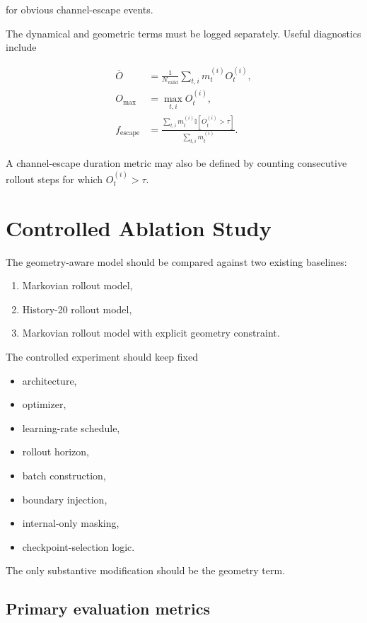\documentclass[11pt]{article}
\begin{document}
for obvious channel-escape events.

The dynamical and geometric terms must be logged separately. Useful diagnostics include

\begin{align}
    \overline{O}
    &=
    \frac{1}{N_{\mathrm{valid}}}
    \sum_{t,i}
    m_t^{(i)} O_t^{(i)},\\
    O_{\max}
    &=
    \max_{t,i}
    O_t^{(i)},\\
    f_{\mathrm{escape}}
    &=
    \frac{
    \sum_{t,i}
    m_t^{(i)}
    \mathbb{I}[O_t^{(i)}>\tau]
    }{
    \sum_{t,i}
    m_t^{(i)}
    }.
\end{align}

A channel-escape duration metric may also be defined by counting consecutive rollout steps for which $O_t^{(i)}>\tau$.

\section{Controlled Ablation Study}

The geometry-aware model should be compared against two existing baselines:

\begin{enumerate}[leftmargin=1.8em]
    \item Markovian rollout model,
    \item History-20 rollout model,
    \item Markovian rollout model with explicit geometry constraint.
\end{enumerate}

The controlled experiment should keep fixed

\begin{itemize}[leftmargin=1.5em]
    \item architecture,
    \item optimizer,
    \item learning-rate schedule,
    \item rollout horizon,
    \item batch construction,
    \item boundary injection,
    \item internal-only masking,
    \item checkpoint-selection logic.
\end{itemize}

The only substantive modification should be the geometry term.

\subsection{Primary evaluation metrics}
\end{document}
